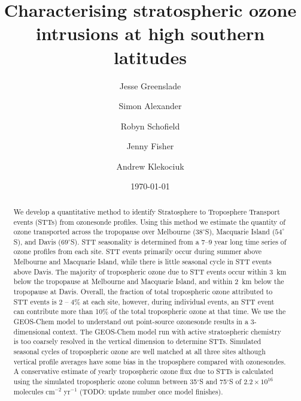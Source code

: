 \documentclass{article}
\begin{document}
\title{Characterising stratospheric ozone intrusions at high southern latitudes}

\author[1]{Jesse Greenslade}
\author[2]{Simon Alexander}
\author[3,4]{Robyn Schofield}
\author[1,5]{Jenny Fisher}
\author[2]{Andrew Klekociuk}


\date{\today}



\maketitle

\begin{abstract}
  We develop a quantitative method to identify Stratosphere to Troposphere Transport events (STTs) from ozonesonde profiles. 
  Using this method we estimate the quantity of ozone transported across the tropopause over Melbourne ($38^\circ$S), Macquarie Island ($54^\circ$S), and Davis ($69^\circ$S).
  STT seasonality is determined from a 7--9 year long time series of ozone profiles from each site.
  STT events primarily occur during summer above Melbourne and Macquarie Island, while there is little seasonal cycle in STT events above Davis.
  The majority of tropospheric ozone due to STT events occur within 3~km below the tropopause at Melbourne and Macquarie Island, and within 2~km below the tropopause at Davis.
  Overall, the fraction of total tropospheric ozone attributed to STT events is 2 – 4\% at each site, however, during individual events, an STT event can contribute more than 10\% of the total tropospheric ozone at that time.
  We use the GEOS-Chem model to understand out point-source ozonesonde results in a 3-dimensional context.
  The GEOS-Chem model run with active stratospheric chemistry is too coarsely resolved in the vertical dimension to determine STTs.
  Simulated seasonal cycles of tropospheric ozone are well matched at all three sites although vertical profile averages have some bias in the troposphere compared with ozonesondes.
  A conservative estimate of yearly tropospheric ozone flux due to STTs is calculated using the simulated tropospheric ozone column between 35$^\circ$S and  75$^\circ$S of $2.2\times10^{16}$ molecules cm$^{-2}$ yr$^{-1}$ (TODO: update number once model finishes).
  
\end{abstract}%
\end{document}
